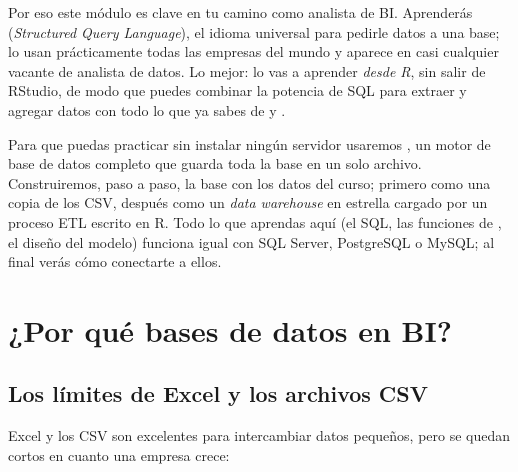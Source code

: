 Por eso este módulo es clave en tu camino como analista de BI. Aprenderás
 (\emph{Structured Query Language}), el idioma universal para
pedirle datos a una base; lo usan prácticamente todas las empresas del mundo
y aparece en casi cualquier vacante de analista de datos. Lo mejor: lo vas a
aprender \emph{desde R}, sin salir de RStudio, de modo que puedes combinar la
potencia de SQL para extraer y agregar datos con todo lo que ya sabes de
 y .

Para que puedas practicar sin instalar ningún servidor usaremos
, un motor de base de datos completo que guarda toda la base
en un solo archivo. Construiremos, paso a paso, la base
 con los datos del curso; primero como una
copia de los CSV, después como un \emph{data warehouse} en estrella cargado
por un proceso ETL escrito en R. Todo lo que aprendas aquí (el SQL, las
funciones de , el diseño del modelo) funciona igual con SQL
Server, PostgreSQL o MySQL; al final verás cómo conectarte a ellos.

\section{¿Por qué bases de datos en BI?}
\label{sec:m5-porque}

\subsection{Los límites de Excel y los archivos CSV}

Excel y los CSV son excelentes para intercambiar datos pequeños, pero se
quedan cortos en cuanto una empresa crece:

